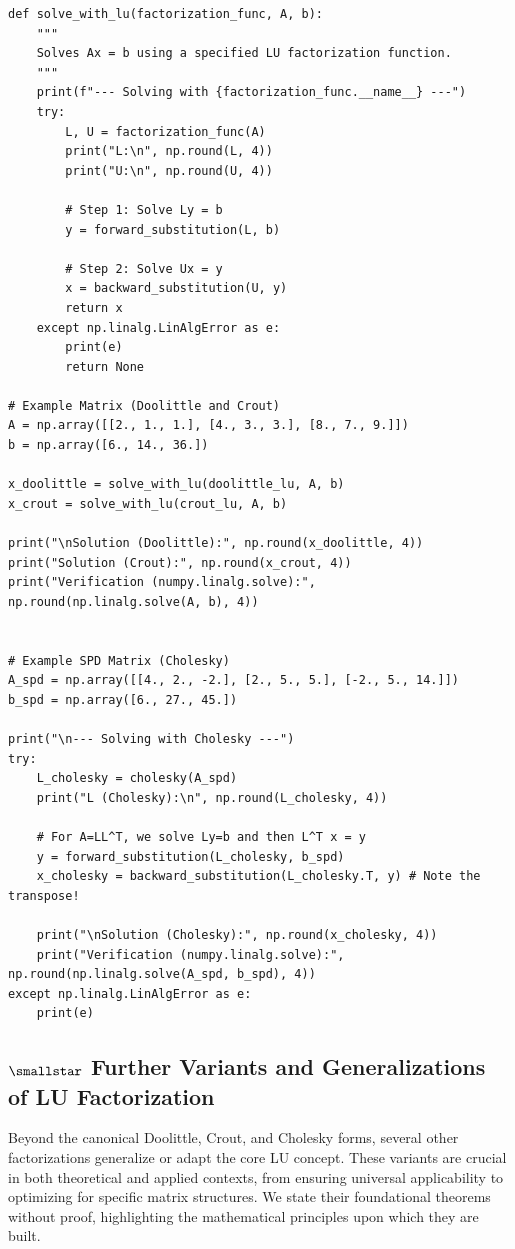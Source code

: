 \begin{verbatim}
def solve_with_lu(factorization_func, A, b):
    """
    Solves Ax = b using a specified LU factorization function.
    """
    print(f"--- Solving with {factorization_func.__name__} ---")
    try:
        L, U = factorization_func(A)
        print("L:\n", np.round(L, 4))
        print("U:\n", np.round(U, 4))
        
        # Step 1: Solve Ly = b
        y = forward_substitution(L, b)
        
        # Step 2: Solve Ux = y
        x = backward_substitution(U, y)
        return x
    except np.linalg.LinAlgError as e:
        print(e)
        return None

# Example Matrix (Doolittle and Crout)
A = np.array([[2., 1., 1.], [4., 3., 3.], [8., 7., 9.]])
b = np.array([6., 14., 36.])

x_doolittle = solve_with_lu(doolittle_lu, A, b)
x_crout = solve_with_lu(crout_lu, A, b)

print("\nSolution (Doolittle):", np.round(x_doolittle, 4))
print("Solution (Crout):", np.round(x_crout, 4))
print("Verification (numpy.linalg.solve):", np.round(np.linalg.solve(A, b), 4))


# Example SPD Matrix (Cholesky)
A_spd = np.array([[4., 2., -2.], [2., 5., 5.], [-2., 5., 14.]])
b_spd = np.array([6., 27., 45.])

print("\n--- Solving with Cholesky ---")
try:
    L_cholesky = cholesky(A_spd)
    print("L (Cholesky):\n", np.round(L_cholesky, 4))
    
    # For A=LL^T, we solve Ly=b and then L^T x = y
    y = forward_substitution(L_cholesky, b_spd)
    x_cholesky = backward_substitution(L_cholesky.T, y) # Note the transpose!
    
    print("\nSolution (Cholesky):", np.round(x_cholesky, 4))
    print("Verification (numpy.linalg.solve):", np.round(np.linalg.solve(A_spd, b_spd), 4))
except np.linalg.LinAlgError as e:
    print(e)
\end{verbatim}

\subsection{$\smallstar$ Further Variants and Generalizations of LU Factorization}

Beyond the canonical Doolittle, Crout, and Cholesky forms, several other factorizations generalize or adapt the core LU concept. These variants are crucial in both theoretical and applied contexts, from ensuring universal applicability to optimizing for specific matrix structures. We state their foundational theorems without proof, highlighting the mathematical principles upon which they are built.

